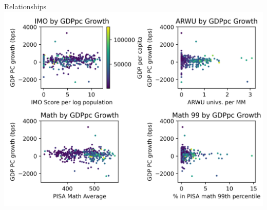 \documentclass[10pt]{beamer}
\begin{document}
\begin{frame}{Relationships}
    \centering
    \includegraphics[width=\textwidth]{../charts/relationships.png}
\end{frame}
\end{document}
